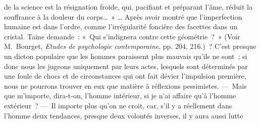 \documentclass[french,twoside]{book} %
\begin{document}
{de la science est la résignation froide, qui, pacifiant et préparant l’âme, réduit la souffrance à la douleur du corps… » … Après avoir montré que l’imperfection humaine est dans l’ordre, comme l’irrégularité foncière des facettes dans un cristal. Taine demande : « Qui s’indignera contre cette géométrie ? » (Voir M. Bourget, \emph{Etudes de psychologie contemporaine}, pp. 204, 216.)} ? C’est presque un dicton populaire que les hommes paraissent plus mauvais qu’ils ne sont ; si donc nous les jugeons uniquement par leurs actes, lesquels sont déterminés par une foule de chocs et de circonstances qui ont fait dévier l’impulsion première, nous ne pourrons trouver en eux que matière à réflexions pessimistes. — Mais que m’importe, dira-t-on, l’homme intérieur, si je n’ai affaire qu’à l’homme extérieur ? — Il importe plus qu’on ne croit, car, s’il y a réellement dans l’homme deux tendances, presque deux volontés inverses, il y aura aussi lutte\par
\end{document}
